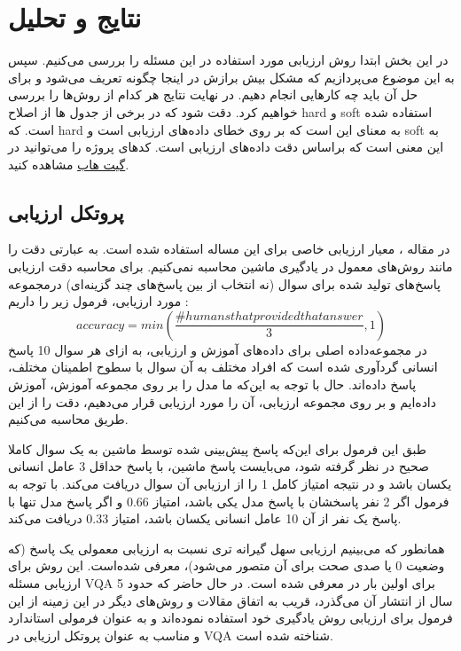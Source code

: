 \section{ نتایج و تحلیل}
{  در این بخش ابتدا روش ارزیابی مورد استفاده در این مسئله را بررسی می‌کنیم. سپس به این موضوع می‌پردازیم که مشکل بیش برازش در اینجا چگونه تعریف می‌شود و برای حل آن باید چه کارهایی انجام دهیم. در نهایت نتایج هر کدام از روش‌ها را بررسی خواهیم کرد. دقت شود که در برخی از جدول ها از اصلاح hard‌ و soft استفاده شده است. که hard به معنای این است که 
	  بر روی خطای داده‌های ارزیابی است و soft به این معنی است که 
	  براساس دقت داده‌های ارزیابی است. کدهای پروژه را می‌توانید در
	  \href{https://github.com/maryamhashemi/Persian_VQA}{ گیت هاب}
	  مشاهده کنید.
	\subsection{پروتکل ارزیابی}
	{
		در مقاله
		\cite{antol2015vqa}
		، معیار ارزیابی خاصی برای این مساله استفاده شده است. به عبارتی دقت را مانند روش‌های معمول در یادگیری ماشین محاسبه نمی‌کنیم. برای محاسبه دقت ارزیابی پاسخ‌های تولید شده برای سوال (نه انتخاب از بین پاسخ‌های چند گزینه‌ای)   درمجموعه مورد ارزیابی، فرمول زیر را داریم :
		\begin{equation}
		accuracy = min(\frac{\# humans that provided that answer}{3} , 1)
		\label{eq:2}
		\end{equation}
		در مجموعه‌داده اصلی برای داده‌های آموزش و ارزیابی، به ازای هر سوال 10 پاسخ انسانی گردآوری شده است که افراد مختلف به آن سوال با سطوح اطمینان مختلف، پاسخ داده‌اند. حال با توجه به این‌که ما مدل را بر روی مجموعه آموزش، آموزش داده‌ایم و بر روی مجموعه ارزیابی، آن را مورد ارزیابی قرار می‌دهیم، دقت را از این طریق محاسبه می‌کنیم.
		
		طبق این فرمول برای این‌که پاسخ پیش‌بینی شده توسط ماشین به یک سوال کاملا صحیح در نظر گرفته شود، می‌بایست پاسخ ماشین، با پاسخ حداقل 3 عامل انسانی یکسان باشد و در نتیجه امتیاز کامل 1 را از ارزیابی آن سوال دریافت می‌کند. با توجه به فرمول اگر 2 نفر پاسخشان با پاسخ مدل یکی باشد، امتیاز 0.66 و اگر پاسخ مدل تنها با پاسخ یک نفر از آن 10 عامل انسانی یکسان باشد، امتیاز 0.33 دریافت می‌کند.
		
		همانطور که می‌بینیم ارزیابی سهل گیرانه تری نسبت به ارزیابی معمولی یک پاسخ (که وضعیت 0 یا صدی صحت برای آن متصور می‌شود)، معرفی شده‌است.  این روش برای ارزیابی مسئله VQA برای اولین بار در 
		\cite{antol2015vqa}
		معرفی شده است. در حال حاضر که حدود 5 سال از انتشار آن می‌گذرد، قریب به اتفاق مقالات و روش‌های دیگر در این زمینه از این فرمول برای ارزیابی روش یادگیری خود استفاده نموده‌اند و به عنوان فرمولی استاندارد و مناسب به عنوان پروتکل ارزیابی در VQA شناخته شده است.
		
}}
